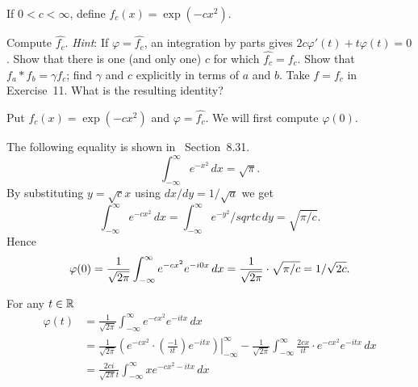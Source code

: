 \begin{enumerate}
\begin{excopy}
If \(0 < c < \infty\), define \(f_c(x) = \exp(-cx^2)\).
\begin{itemize}
  Compute \(\widehat{f_c}\). \emph{Hint}: If \(\varphi = \widehat{f_c}\),
    an integration by parts gives \(2c\varphi'(t) + t\varphi(t) = 0\).
  Show that there is one (and only one) $c$ for which \(\widehat{f_c} = f_c\).
  Show that \(f_a \ast f_b = \gamma f_c\); find \(\gamma\) and $c$ 
  explicitly in terms of $a$ and $b$.
  Take \(f = f_c\) in Exercise~11. What is the resulting identity?
\end{itemize} 
\end{excopy}

\begin{itemize}
Put \(f_c(x) = \exp(-cx^2)\) and \(\varphi = \widehat{f_c}\).
We will first compute \(\varphi(0)\).

The following equality is shown 
in \cite{RudinPMA85}~Section~8.31.
\begin{equation*}
\int_{-\infty}^\infty e^{-x^2}\,dx = \sqrt{\pi}.
\end{equation*}
By substituting \(y=\sqrt{c}x\) using \(dx/dy=1/\sqrt{a}\) we get
\begin{equation*}
\int_{-\infty}^\infty e^{-cx^2}\,dx 
= \int_{-\infty}^\infty e^{-y^2}/sqrt{c}\,dy = \sqrt{\pi/c}.
\end{equation*}
Hence
\begin{equation*}
\varphi(0)
= \frac{1}{\sqrt{2\pi}} \int_{-\infty}^\infty e^{-cx^2}e^{-i0x}\,dx \\
= \frac{1}{\sqrt{2\pi}} \cdot \sqrt{\pi/c} 
= 1 / \sqrt{2c}.
\end{equation*}

For any \(t\in\mathbb{R}\)
\begin{align*}
\varphi(t) 
&= \frac{1}{\sqrt{2\pi}} \int_{-\infty}^\infty e^{-cx^2}e^{-itx}\,dx \\
&= \frac{1}{\sqrt{2\pi}} 
  \left.\left(e^{-cx^2}\cdot
        \left(\frac{-1}{it}\right)e^{-itx}
  \right)\right|_{-\infty}^\infty
  - \frac{1}{\sqrt{2\pi}} \int_{-\infty}^\infty 
        \frac{2cx}{it}\cdot  e^{-cx^2}e^{-itx}\,dx \\
&= \frac{2ci}{\sqrt{2\pi}t} \int_{-\infty}^\infty x e^{-cx^2-itx}\,dx
\end{align*}


\end{itemize}
\end{enumerate}
